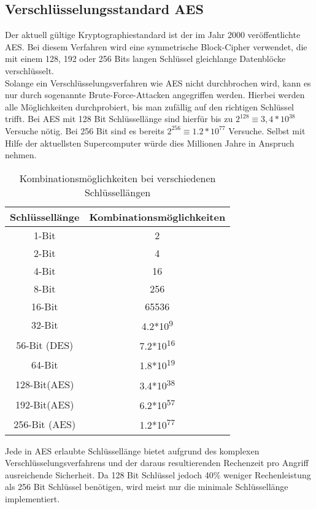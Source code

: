 \subsection{Verschlüsselungsstandard AES}\label{ss:AES}

Der aktuell gültige Kryptographiestandard ist der im Jahr 2000 veröffentlichte \ac{AES}. Bei diesem Verfahren wird eine symmetrische Block-Cipher verwendet, die mit einem 128, 192 oder 256 Bits langen Schlüssel gleichlange Datenblöcke verschlüsselt\cite{ws:AES}.\\
Solange ein Verschlüsselungsverfahren wie \ac{AES} nicht durchbrochen wird, kann es nur durch sogenannte Brute-Force-Attacken angegriffen werden. Hierbei werden alle Möglichkeiten durchprobiert, bis man zufällig auf den richtigen Schlüssel trifft. Bei \ac{AES} mit 128 Bit Schlüssellänge sind hierfür bis zu $2^{128}\equiv 3,4*10^{38}$ Versuche nötig. Bei 256 Bit sind es bereits $2^{256}\equiv 1.2*10^{77}$ Versuche. Selbst mit Hilfe der aktuellsten Supercomputer würde dies Millionen Jahre in Anspruch nehmen.\\

\begin{table}[H] 
	\centering
	\begin{tabular}{|c|c|}\hline
		Schlüssellänge & Kombinationsmöglichkeiten\\ \hline \hline
		1-Bit & 2 \\ \hline
		2-Bit & 4 \\ \hline
		4-Bit & 16 \\ \hline
		8-Bit & 256 \\ \hline
		16-Bit & 65536 \\ \hline
		32-Bit & 4.2*10\textsuperscript{9} \\ \hline
		56-Bit (DES) & 7.2*10\textsuperscript{16} \\ \hline
		64-Bit  & 1.8*10\textsuperscript{19} \\ \hline
		128-Bit(AES) & 3.4*10\textsuperscript{38} \\ \hline
		192-Bit(AES) & 6.2*10\textsuperscript{57} \\ \hline
		256-Bit (AES) &  1.2*10\textsuperscript{77} \\ \hline
	\end{tabular}
	\caption{Kombinationsmöglichkeiten bei verschiedenen Schlüssellängen}
	\label{t:keylength}
\end{table}
\vspace{5 mm}

Jede in \ac{AES} erlaubte Schlüssellänge bietet aufgrund des komplexen Verschlüsselungsverfahrens und der daraus resultierenden Rechenzeit pro Angriff ausreichende Sicherheit. Da 128 Bit Schlüssel jedoch 40\% weniger Rechenleistung als 256 Bit Schlüssel benötigen, wird meist nur die minimale Schlüssellänge implementiert. 